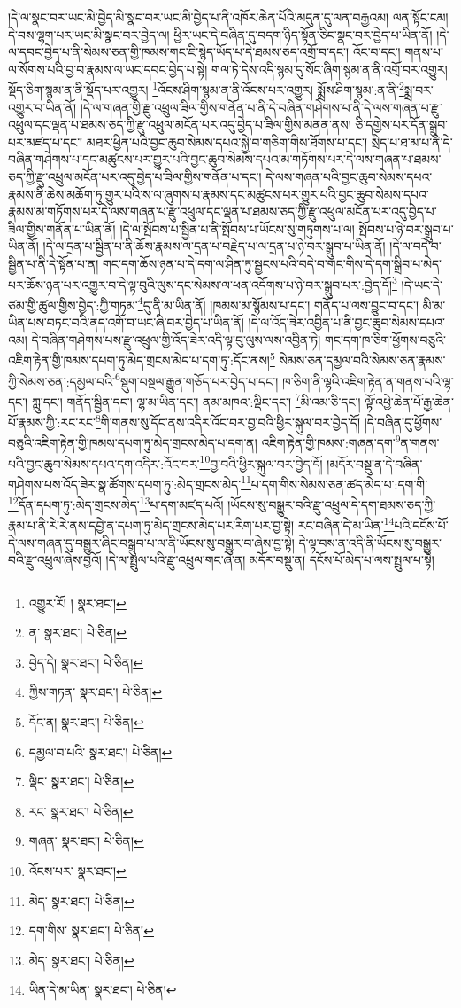 །དེ་ལ་སྣང་བར་ཡང་མི་བྱེད་མི་སྣང་བར་ཡང་མི་བྱེད་པ་ནི་འཁོར་ཆེན་པོའི་མདུན་དུ་ལན་བརྒྱའམ། ལན་སྟོང་ངམ། དེ་བས་ལྷག་པར་ཡང་མི་སྣང་བར་བྱེད་ལ། ཕྱིར་ཡང་དེ་བཞིན་དུ་བདག་ཉིད་སྟོན་ཅིང་སྣང་བར་བྱེད་པ་ཡིན་ནོ། །དེ་ལ་དབང་བྱེད་པ་ནི་སེམས་ཅན་གྱི་ཁམས་གང་ཇི་སྙེད་ཡོད་པ་དེ་ཐམས་ཅད་འགྲོ་བ་དང་། འོང་བ་དང་། གནས་པ་ལ་སོགས་པའི་བྱ་བ་རྣམས་ལ་ཡང་དབང་བྱེད་པ་སྟེ། གལ་ཏེ་དེས་འདི་སྙམ་དུ་སོང་ཞིག་སྙམ་ན་ནི་འགྲོ་བར་འགྱུར། སྡོད་ཅིག་སྙམ་ན་ནི་སྡོད་པར་འགྱུར། \footnote{འགྱུར་རོ། །   སྣར་ཐང་། }འོངས་ཤིག་སྙམ་ན་ནི་འོངས་པར་འགྱུར། སྨྲོས་ཤིག་སྙམ་:ན་ནི་\footnote{ན་  སྣར་ཐང་།  པེ་ཅིན། }སྨྲ་བར་འགྱུར་བ་ཡིན་ནོ། །དེ་ལ་གཞན་གྱི་རྫུ་འཕྲུལ་ཟིལ་གྱིས་གནོན་པ་ནི་དེ་བཞིན་གཤེགས་པ་ནི་དེ་ལས་གཞན་པ་རྫུ་འཕྲུལ་དང་ལྡན་པ་ཐམས་ཅད་ཀྱི་རྫུ་འཕྲུལ་མངོན་པར་འདུ་བྱེད་པ་ཟིལ་གྱིས་མནན་ནས། ཅི་དགྱེས་པར་དོན་སྒྲུབ་པར་མཛད་པ་དང་། མཐར་ཕྱིན་པའི་བྱང་ཆུབ་སེམས་དཔའ་སྐྱེ་བ་གཅིག་གིས་ཐོགས་པ་དང་། སྲིད་པ་ཐ་མ་པ་ནི་དེ་བཞིན་གཤེགས་པ་དང་མཚུངས་པར་གྱུར་པའི་བྱང་ཆུབ་སེམས་དཔའ་མ་གཏོགས་པར་དེ་ལས་གཞན་པ་ཐམས་ཅད་ཀྱི་རྫུ་འཕྲུལ་མངོན་པར་འདུ་བྱེད་པ་ཟིལ་གྱིས་གནོན་པ་དང་། དེ་ལས་གཞན་པའི་བྱང་ཆུབ་སེམས་དཔའ་རྣམས་ནི་ཆེས་མཆོག་ཏུ་གྱུར་པའི་ས་ལ་ཞུགས་པ་རྣམས་དང་མཚུངས་པར་གྱུར་པའི་བྱང་ཆུབ་སེམས་དཔའ་རྣམས་མ་གཏོགས་པར་དེ་ལས་གཞན་པ་རྫུ་འཕྲུལ་དང་ལྡན་པ་ཐམས་ཅད་ཀྱི་རྫུ་འཕྲུལ་མངོན་པར་འདུ་བྱེད་པ་ཟིལ་གྱིས་གནོན་པ་ཡིན་ནོ། །དེ་ལ་སྤོབས་པ་སྦྱིན་པ་ནི་སྤོབས་པ་ཡོངས་སུ་གཏུགས་པ་ལ། སྤོབས་པ་ཉེ་བར་སྒྲུབ་པ་ཡིན་ནོ། །དེ་ལ་དྲན་པ་སྦྱིན་པ་ནི་ཆོས་རྣམས་ལ་དྲན་པ་བརྗེད་པ་ལ་དྲན་པ་ཉེ་བར་སྒྲུབ་པ་ཡིན་ནོ། །དེ་ལ་བདེ་བ་སྦྱིན་པ་ནི་དེ་སྟོན་པ་ན། གང་དག་ཆོས་ཉན་པ་དེ་དག་ལ་ཤིན་ཏུ་སྦྱངས་པའི་བདེ་བ་གང་གིས་དེ་དག་སྒྲིབ་པ་མེད་པར་ཆོས་ཉན་པར་འགྱུར་བ་དེ་ལྟ་བུའི་ལུས་དང་སེམས་ལ་ཕན་འདོགས་པ་ཉེ་བར་སྒྲུབ་པར་:བྱེད་དོ།\footnote{བྱེད་དེ།  སྣར་ཐང་།  པེ་ཅིན། } །དེ་ཡང་དེ་ཙམ་གྱི་ཚུལ་གྱིས་བྱེད་:ཀྱི་གཏམ་\footnote{ཀྱིས་གཏན་  སྣར་ཐང་།  པེ་ཅིན། }དུ་ནི་མ་ཡིན་ནོ། །ཁམས་མ་སྙོམས་པ་དང་། གནོད་པ་ལས་བྱུང་བ་དང་། མི་མ་ཡིན་པས་བཏང་བའི་ནད་འགོ་བ་ཡང་ཞི་བར་བྱེད་པ་ཡིན་ནོ། །དེ་ལ་འོད་ཟེར་འབྱིན་པ་ནི་བྱང་ཆུབ་སེམས་དཔའ་འམ། དེ་བཞིན་གཤེགས་པས་རྫུ་འཕྲུལ་གྱི་འོད་ཟེར་འདི་ལྟ་བུ་ལུས་ལས་འབྱིན་ཏེ། གང་དག་ཁ་ཅིག་ཕྱོགས་བཅུའི་འཇིག་རྟེན་གྱི་ཁམས་དཔག་ཏུ་མེད་གྲངས་མེད་པ་དག་ཏུ་:དོང་ནས།\footnote{དོང་ན།  སྣར་ཐང་།  པེ་ཅིན། } སེམས་ཅན་དམྱལ་བའི་སེམས་ཅན་རྣམས་ཀྱི་སེམས་ཅན་:དམྱལ་བའི་\footnote{དམྱལ་བ་པའི་  སྣར་ཐང་།  པེ་ཅིན། }སྡུག་བསྔལ་རྒྱུན་གཅོད་པར་བྱེད་པ་དང་། ཁ་ཅིག་ནི་ལྷའི་འཇིག་རྟེན་ན་གནས་པའི་ལྷ་དང་། ཀླུ་དང་། གནོད་སྦྱིན་དང་། ལྷ་མ་ཡིན་དང་། ནམ་མཁའ་:ལྡིང་དང་། \footnote{ལྡིང་  སྣར་ཐང་།  པེ་ཅིན། }མི་འམ་ཅི་དང་། ལྟོ་འཕྱེ་ཆེན་པོ་རྒྱ་ཆེན་པོ་རྣམས་ཀྱི་:རང་རང་\footnote{རང་  སྣར་ཐང་།  པེ་ཅིན། }གི་གནས་སུ་དོང་ནས་འདིར་འོང་བར་བྱ་བའི་ཕྱིར་སྐུལ་བར་བྱེད་དོ། །དེ་བཞིན་དུ་ཕྱོགས་བཅུའི་འཇིག་རྟེན་གྱི་ཁམས་དཔག་ཏུ་མེད་གྲངས་མེད་པ་དག་ན། འཇིག་རྟེན་གྱི་ཁམས་:གཞན་དག་\footnote{གཞན་  སྣར་ཐང་།  པེ་ཅིན། }ན་གནས་པའི་བྱང་ཆུབ་སེམས་དཔའ་དག་འདིར་:འོང་བར་\footnote{འོངས་པར་  སྣར་ཐང་། }བྱ་བའི་ཕྱིར་སྐུལ་བར་བྱེད་དོ། །མདོར་བསྡུ་ན་དེ་བཞིན་གཤེགས་པས་འོད་ཟེར་སྣ་ཚོགས་དཔག་ཏུ་:མེད་གྲངས་མེད་\footnote{མེད་  སྣར་ཐང་།  པེ་ཅིན། }པ་དག་གིས་སེམས་ཅན་ཚད་མེད་པ་:དག་གི་\footnote{དག་གིས་  སྣར་ཐང་།  པེ་ཅིན། }དོན་དཔག་ཏུ་:མེད་གྲངས་མེད་\footnote{མེད་  སྣར་ཐང་།  པེ་ཅིན། }པ་དག་མཛད་པའོ། །ཡོངས་སུ་བསྒྱུར་བའི་རྫུ་འཕྲུལ་དེ་དག་ཐམས་ཅད་ཀྱི་རྣམ་པ་ནི་རེ་རེ་ནས་དབྱེ་ན་དཔག་ཏུ་མེད་གྲངས་མེད་པར་རིག་པར་བྱ་སྟེ། རང་བཞིན་དེ་མ་ཡིན་\footnote{ཡིན་དེ་མ་ཡིན་  སྣར་ཐང་།  པེ་ཅིན། }པའི་དངོས་པོ་དེ་ལས་གཞན་དུ་བསྒྱུར་ཞིང་བསྒྲུབ་པ་ལ་ནི་ཡོངས་སུ་བསྒྱུར་བ་ཞེས་བྱ་སྟེ། དེ་ལྟ་བས་ན་འདི་ནི་ཡོངས་སུ་བསྒྱུར་བའི་རྫུ་འཕྲུལ་ཞེས་བྱའོ། །དེ་ལ་སྤྲུལ་པའི་རྫུ་འཕྲུལ་གང་ཞེ་ན། མདོར་བསྡུ་ན། དངོས་པོ་མེད་པ་ལས་སྤྲུལ་པ་སྟེ། 